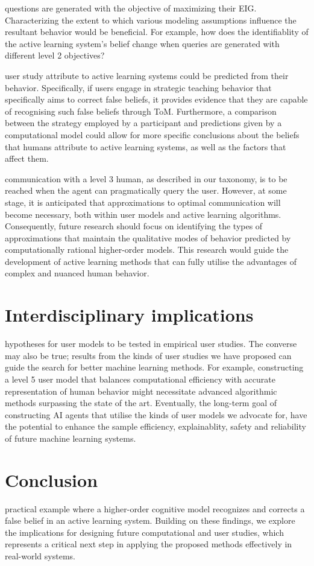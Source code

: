 \documentclass[letterpaper]{article} %
\begin{document}
 questions are generated with the objective of maximizing their EIG. Characterizing the extent to which various modeling assumptions influence the resultant behavior would be beneficial. For example, how does the identifiablity of the active learning system's belief change when queries are generated with different level 2 objectives?

 user study attribute to active learning systems could be predicted from their behavior. Specifically, if users engage in strategic teaching behavior that specifically aims to correct false beliefs, it provides evidence that they are capable of recognising such false beliefs through ToM. Furthermore, a comparison between the strategy employed by a participant and predictions given by a computational model could allow for more specific conclusions about the beliefs that humans attribute to active learning systems, as well as the factors that affect them.

 communication with a level 3 human, as described in our taxonomy, is to be reached when the agent can pragmatically query the user. However, at some stage, it is anticipated that approximations to optimal communication will become necessary, both within user models and active learning algorithms. Consequently, future research should focus on identifying the types of approximations that maintain the qualitative modes of behavior predicted by computationally rational higher-order models. This research would guide the development of active learning methods that can fully utilise the advantages of complex and nuanced human behavior.

\section{Interdisciplinary implications}

 hypotheses for user models to be tested in empirical user studies. The converse may also be true; results from the kinds of user studies we have proposed can guide the search for better machine learning methods. For example, constructing a level 5 user model that balances computational efficiency with accurate representation of human behavior might necessitate advanced algorithmic methods surpassing the state of the art. Eventually, the long-term goal of constructing AI agents that utilise the kinds of user models we advocate for, have the potential to enhance the sample efficiency, explainablity, safety and reliability of future machine learning systems.

\section{Conclusion}

 practical example where a higher-order cognitive model recognizes and corrects a false belief in an active learning system. Building on these findings, we explore the implications for designing future computational and user studies, which represents a critical next step in applying the proposed methods effectively in real-world systems.


\clearpage

\end{document}
